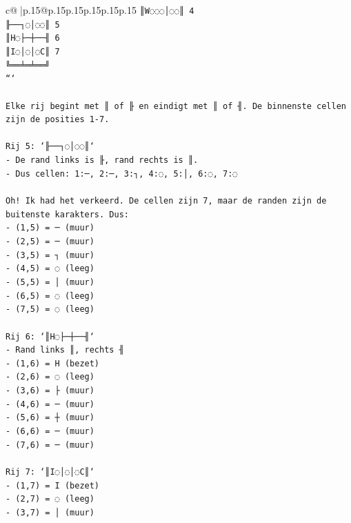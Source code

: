 \documentclass{article}
\begin{document}
{\begin{supertabular}{c@{$\;$}|p{.15\linewidth}@{}p{.15\linewidth}p{.15\linewidth}p{.15\linewidth}p{.15\linewidth}p{.15\linewidth}}
{{{\texttt{║W◌◌◌│◌◌║ 4} \\
\texttt{╟──┐◌│◌◌║ 5} \\
\texttt{║H◌├─┼──╢ 6} \\
\texttt{║I◌│◌│◌C║ 7} \\
\texttt{╚══╧═╧══╝} \\
\texttt{```} \\
\\ 
\texttt{Elke rij begint met ║ of ╟ en eindigt met ║ of ╢. De binnenste cellen zijn de posities 1{-}7.} \\
\\ 
\texttt{Rij 5: `╟──┐◌│◌◌║`} \\
\texttt{{-} De rand links is ╟, rand rechts is ║.} \\
\texttt{{-} Dus cellen: 1:─, 2:─, 3:┐, 4:◌, 5:│, 6:◌, 7:◌} \\
\\ 
\texttt{Oh! Ik had het verkeerd. De cellen zijn 7, maar de randen zijn de buitenste karakters. Dus:} \\
\texttt{{-} (1,5) = ─ (muur)} \\
\texttt{{-} (2,5) = ─ (muur)} \\
\texttt{{-} (3,5) = ┐ (muur)} \\
\texttt{{-} (4,5) = ◌ (leeg)} \\
\texttt{{-} (5,5) = │ (muur)} \\
\texttt{{-} (6,5) = ◌ (leeg)} \\
\texttt{{-} (7,5) = ◌ (leeg)} \\
\\ 
\texttt{Rij 6: `║H◌├─┼──╢`} \\
\texttt{{-} Rand links ║, rechts ╢} \\
\texttt{{-} (1,6) = H (bezet)} \\
\texttt{{-} (2,6) = ◌ (leeg)} \\
\texttt{{-} (3,6) = ├ (muur)} \\
\texttt{{-} (4,6) = ─ (muur)} \\
\texttt{{-} (5,6) = ┼ (muur)} \\
\texttt{{-} (6,6) = ─ (muur)} \\
\texttt{{-} (7,6) = ─ (muur)} \\
\\ 
\texttt{Rij 7: `║I◌│◌│◌C║`} \\
\texttt{{-} (1,7) = I (bezet)} \\
\texttt{{-} (2,7) = ◌ (leeg)} \\
\texttt{{-} (3,7) = │ (muur)} \\
}}}
\end{supertabular}}
\end{document}

